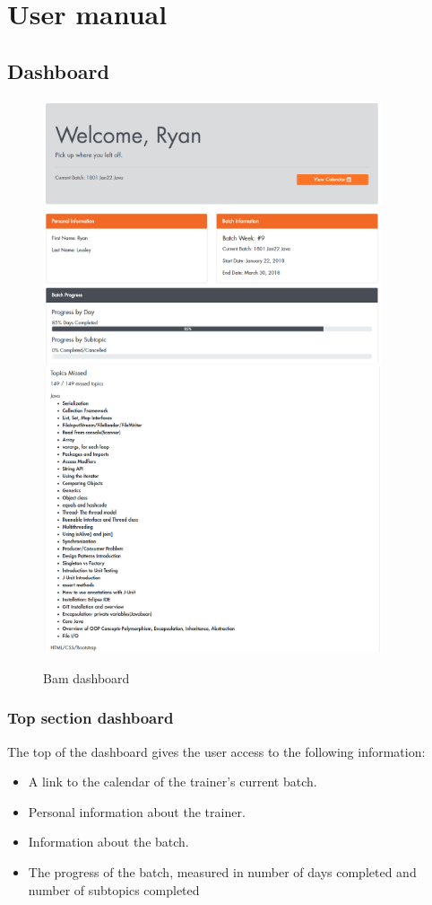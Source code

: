 \chapter{User manual}
\section{Dashboard}
\begin{figure}[htp]
\centering
\includegraphics[width=10cm]{images/dashboard}
\includegraphics[width=10cm]{images/topicdash}
\caption{Bam dashboard}
\label{fig:lion}
\end{figure}
\subsection{Top section dashboard}
The top of the dashboard gives the user access to the following information:
\begin{itemize}
    \item A link to the calendar of the trainer’s current batch.
    \item Personal information about the trainer.
    \item Information about the batch.
    \item The progress of the batch, measured in number of days completed and number of subtopics completed
\end{itemize}
